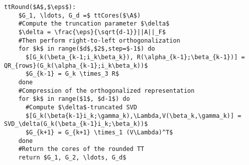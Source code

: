 

\begin{lstlisting}[float, floatplacement=b!, caption=TT-rounding algorithm, label=algo:tt-round, title=TT-rounding algorithm]
  ttRound($A$,$\eps$):
    $G_1, \ldots, G_d =$ ttCores($\A$)
    #Compute the truncation parameter $\delta$
    $\delta = \frac{\eps}{\sqrt{d-1}}||A||_F$
    #Then perform right-to-left orthogonalization
    for $k$ in range($d$,$2$,step=$-1$) do
      $[G_k(\beta_{k-1;i_k\beta_k}), R(\alpha_{k-1};\beta_{k-1})] = QR_{rows}(G_k(\alpha_{k-1};i_k\beta_k))$
      $G_{k-1} = G_k \times_3 R$
    done
    #Compression of the orthogonalized representation
    for $k$ in range($1$, $d-1$) do
      #Compute $\delta$-truncated SVD
      $[G_k(\beta{k-1}i_k;\gamma_k),\Lambda,V(\beta_k,\gamma_k)] = SVD_\delta(G_k(\beta_{k-1}i_k;\beta_k))$
      $G_{k+1} = G_{k+1} \times_1 (V\Lambda)^T$
    done
    #Return the cores of the rounded TT
    return $G_1, G_2, \ldots, G_d$
\end{lstlisting}
